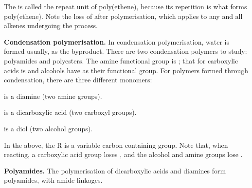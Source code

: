 \begin{center}
\end{center}
The  is called the repeat unit of poly(ethene), because its repetition is what
forms poly(ethene). Note the loss of  after polymerisation, which applies to any and
all alkenes undergoing the process.

\textbf{Condensation polymerisation.} In condensation polymerisation, water is formed usually, as
the byproduct. There are two condensation polymers to study: polyamides and polyesters. The amine
functional group is ; that for carboxylic acids is  and alcohols have
 as their functional group. For polymers formed through condensation, there are three
different monomers:

\begin{center}
\end{center}
is a diamine (two amine groups).

\begin{center}
\end{center}
is a dicarboxylic acid (two carboxyl groups).

\begin{center}
\end{center}
is a diol (two alcohol groups).


In the above, the R is a variable carbon containing group. Note that, when reacting, a carboxylic
acid group loses , and the alcohol and amine groups lose .

\textbf{Polyamides.} The polymerisation of dicarboxylic acids and diamines form polyamides, with
amide linkages.
